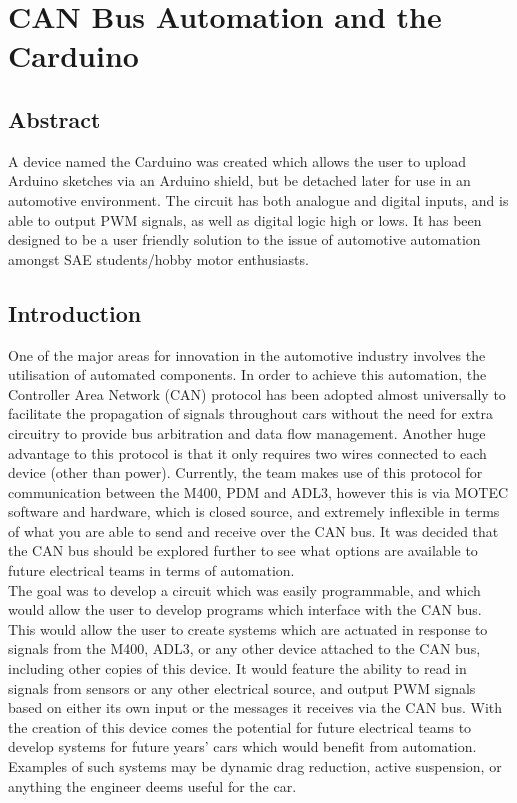 
\chapter{CAN Bus Automation and the Carduino}
\section{Abstract}
A device named the Carduino was created which allows the user to upload Arduino sketches via an Arduino shield, but be detached later for use in an automotive environment. The circuit has both analogue and digital inputs, and is able to output PWM signals, as well as digital logic high or lows. It has been designed to be a user friendly solution to the issue of automotive automation amongst SAE students/hobby motor enthusiasts.

\section{Introduction}
One of the major areas for innovation in the automotive industry involves the utilisation of automated components. In order to achieve this automation, the Controller Area Network (CAN) protocol has been adopted almost universally to facilitate the propagation of signals throughout cars without the need for extra circuitry to provide bus arbitration and data flow management\cite{CAN_standard}. Another huge advantage to this protocol is that it only requires two wires connected to each device (other than power). Currently, the team makes use of this protocol for communication between the M400, PDM and ADL3, however this is via MOTEC software and hardware, which is closed source, and extremely inflexible in terms of what you are able to send and receive over the CAN bus. It was decided that the CAN bus should be explored further to see what options are available to future electrical teams in terms of automation.\\

The goal was to develop a circuit which was easily programmable, and which would allow the user to develop programs which interface with the CAN bus. This would allow the user to create systems which are actuated in response to signals from the M400, ADL3, or any other device attached to the CAN bus, including other copies of this device. It would feature the ability to read in signals from sensors or any other electrical source, and output PWM signals based on either its own input or the messages it receives via the CAN bus. With the creation of this device comes the potential for future electrical teams to develop systems for future years' cars which would benefit from automation. Examples of such systems may be dynamic drag reduction, active suspension, or anything the engineer deems useful for the car.

